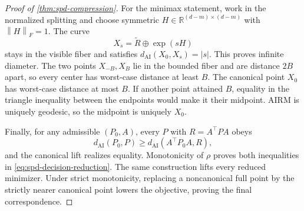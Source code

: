 \documentclass[10pt,a4paper]{amsart}
\newcommand{\AI}{\mathrm{AI}}
\newcommand{\R}{\mathbb R}
\newcommand{\dai}{d_{\AI}}
\newcommand{\fro}[1]{\left\lVert #1\right\rVert_F}
\begin{document}
\begin{proof}[Proof of \cref{thm:spd-compression}]
For the minimax statement, work in the normalized splitting and choose
symmetric \(H\in\R^{(d-m)\times(d-m)}\) with \(\fro H=1\).  The curve
\[
  X_s=\widetilde R\oplus\exp(sH)
\]
stays in the visible fiber and satisfies
\(\dai(X_0,X_s)=|s|\).  This proves infinite diameter.  The two points
\(X_{-B},X_B\) lie in the bounded fiber and are distance \(2B\) apart, so
every center has worst-case distance at least \(B\).  The canonical point
\(X_0\) has worst-case distance at most \(B\).  If another point attained
\(B\), equality in the triangle inequality between the endpoints would make
it their midpoint.  AIRM is uniquely geodesic, so the midpoint is uniquely
\(X_0\).

Finally, for any admissible \((P_0,A)\), every \(P\) with
\(R=A^\top PA\) obeys
\[
  \dai(P_0,P)\ge\dai(A^\top P_0A,R),
\]
and the canonical lift realizes equality.  Monotonicity of \(\rho\) proves
both inequalities in \eqref{eq:spd-decision-reduction}.  The same construction
lifts every reduced minimizer.  Under strict monotonicity, replacing a
noncanonical full point by the strictly nearer canonical point lowers the
objective, proving the final correspondence.
\end{proof}
\end{document}
